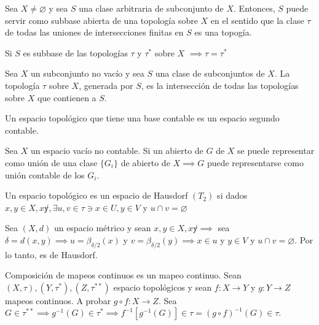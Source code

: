 \begin{teorema}
    Sea $X\neq \varnothing$ y sea $S$ una clase arbitraria de subconjunto de $X$. Entonces, $S$ puede servir como subbase abierta de una topología sobre $X$ en el sentido que la clase $\tau$ de todas las uniones de intersecciones finitas en $S$ es una topogía. 
    
    \begin{lema}
        Si $S$ es subbase de las topologías $\tau$ y $\tau^*$ sobre $X$ $\implies \tau = \tau^*$ 
    \end{lema}
\end{teorema}

\begin{teorema}
    Sea $X$ un subconjunto no vacío y sea $S$ una clase de subconjuntos de $X$. La topología $\tau$ sobre $X$, generada por $S$, es la intersección de todas las topologías sobre $X$ que contienen a $S$. 
    
\end{teorema}


\begin{definicion}
    Un espacio topológico que tiene una base contable es un espacio segundo contable. 
\end{definicion}

\begin{teorema}[de Lindelof]
    Sea $X$ un espacio vacío no contable. Si un abierto de $G$ de $X$ se puede representar como unión de una clase $\{G_i\}$ de abierto de $X\implies G$ puede representarse como unión contable de los $G_i$. 
    
\end{teorema}

\begin{definicion}
    Un espacio topológico es un espacio de Hausdorf $(T_2)$ si dados $x,y\in X,x\not y ,\exists u,v\in \tau \ni x\in U,y\in V$ y $u\cap v =\varnothing$
\end{definicion}

\begin{teorema}
    Sea $(X,d)$ un espacio métrico y sean $x,y\in X, x\not y \implies$ sea $\delta=d(x,y)\implies u=\beta_{\delta/2}(x)$ y $v=\beta_{\delta/2}(y)\implies x\in u$ y $y\in V$ y $u\cap v=\varnothing$. Por lo tanto, es de Hausdorf.
\end{teorema}


\begin{teorema}
    Composición de mapeos continuos es un mapeo continuo. Sean $(X,\tau),(Y,\tau^*),(Z,\tau^{**})$ espacio topológicos y sean $f:X\to Y$ y $g:Y\to Z$ mapeos continuos. A probar $g\circ f: X\to Z$. Sea $G\in \tau^{**}\implies g^{-1}(G)\in \tau^*\implies f^{-1}[g^{-1}(G)]\in \tau =(g\circ f)^{-1}(G)\in \tau$.
\end{teorema}

